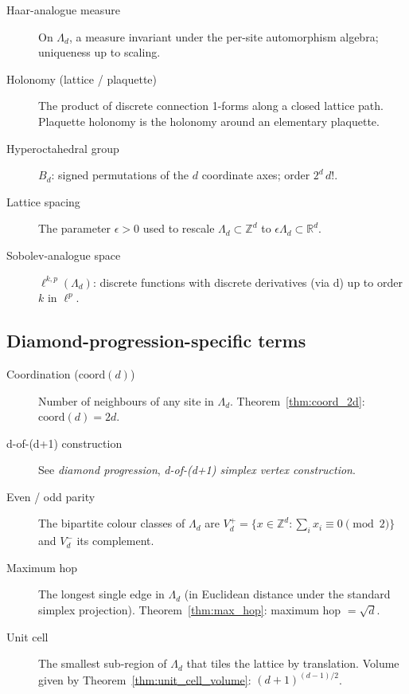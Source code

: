 \begin{description}
\item[Haar-analogue measure]
   On $\Lambda_d$, a measure invariant under the per-site
   automorphism algebra; uniqueness up to scaling.

\item[Holonomy (lattice / plaquette)]
   The product of discrete connection 1-forms along a closed lattice
   path.  Plaquette holonomy is the holonomy around an elementary
   plaquette.

\item[Hyperoctahedral group]
   $B_d$: signed permutations of the $d$ coordinate axes; order
   $2^d \, d!$.

\item[Lattice spacing]
   The parameter $\epsilon > 0$ used to rescale
   $\Lambda_d \subset \mathbb{Z}^d$ to $\epsilon \Lambda_d \subset
   \mathbb{R}^d$.

\item[Sobolev-analogue space]
   $\ell^{k,p}(\Lambda_d)$: discrete functions with discrete
   derivatives (via $\mathrm{d}$) up to order $k$ in $\ell^p$.
\end{description}

\subsection*{Diamond-progression-specific terms}

\begin{description}
\item[Coordination ($\text{coord}(d)$)]
   Number of neighbours of any site in $\Lambda_d$.
   Theorem~\ref{thm:coord_2d}: $\text{coord}(d) = 2d$.

\item[d-of-(d+1) construction]
   See \emph{diamond progression}, \emph{d-of-(d+1) simplex vertex
   construction}.

\item[Even / odd parity]
   The bipartite colour classes of $\Lambda_d$ are
   $V_d^+ = \{x \in \mathbb{Z}^d : \sum_i x_i \equiv 0 \pmod 2\}$
   and $V_d^-$ its complement.

\item[Maximum hop]
   The longest single edge in $\Lambda_d$ (in Euclidean distance
   under the standard simplex projection).
   Theorem~\ref{thm:max_hop}: maximum hop $= \sqrt{d}$.

\item[Unit cell]
   The smallest sub-region of $\Lambda_d$ that tiles the lattice by
   translation.  Volume given by Theorem~\ref{thm:unit_cell_volume}:
   $(d+1)^{(d-1)/2}$.
\end{description}

